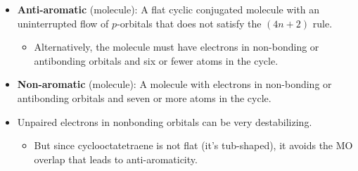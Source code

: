 \documentclass[../notes.tex]{subfiles}
\begin{document}
\begin{itemize}
\begin{itemize}
    \end{itemize}
    \item \textbf{Anti-aromatic} (molecule): A flat cyclic conjugated molecule with an uninterrupted flow of $p$-orbitals that does not satisfy the $(4n+2)$ rule.
    \begin{itemize}
        \item Alternatively, the molecule must have electrons in non-bonding or antibonding orbitals and six or fewer atoms in the cycle.
    \end{itemize}
    \item \textbf{Non-aromatic} (molecule): A molecule with electrons in non-bonding or antibonding orbitals and seven or more atoms in the cycle.
    \item Unpaired electrons in nonbonding orbitals can be very destabilizing.
    \begin{itemize}
        \item But since cyclooctatetraene is not flat (it's tub-shaped), it avoids the MO overlap that leads to anti-aromaticity.
    \end{itemize}
\end{itemize}
\end{document}
